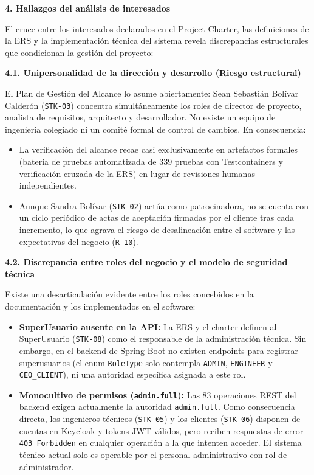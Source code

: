 \documentclass[12pt,varwidth=170mm,border=10pt]{standalone}
\newcommand{\sectiontitle}[1]{%
  \par\vspace{1.8ex}%
  {\normalfont\Large\bfseries #1\par}%
  \vspace{1.0ex}%
}
\newcommand{\subsectiontitle}[1]{%
  \par\vspace{1.3ex}%
  {\normalfont\large\bfseries #1\par}%
  \vspace{0.5ex}%
}
\begin{document}
\sectiontitle{4. Hallazgos del análisis de interesados}
\label{sec:hallazgos}

El cruce entre los interesados declarados en el Project Charter, las definiciones de la ERS y la implementación técnica del sistema revela discrepancias estructurales que condicionan la gestión del proyecto:

\subsectiontitle{4.1. Unipersonalidad de la dirección y desarrollo (Riesgo estructural)}
El Plan de Gestión del Alcance lo asume abiertamente: Sean Sebastián Bolívar Calderón (\texttt{STK-03}) concentra simultáneamente los roles de director de proyecto, analista de requisitos, arquitecto y desarrollador. No existe un equipo de ingeniería colegiado ni un comité formal de control de cambios. En consecuencia:
\begin{itemize}
  \item La verificación del alcance recae casi exclusivamente en artefactos formales (batería de pruebas automatizada de 339 pruebas con Testcontainers y verificación cruzada de la ERS) en lugar de revisiones humanas independientes.
  \item Aunque Sandra Bolívar (\texttt{STK-02}) actúa como patrocinadora, no se cuenta con un ciclo periódico de actas de aceptación firmadas por el cliente tras cada incremento, lo que agrava el riesgo de desalineación entre el software y las expectativas del negocio (\texttt{R-10}).
\end{itemize}

\subsectiontitle{4.2. Discrepancia entre roles del negocio y el modelo de seguridad técnica}
Existe una desarticulación evidente entre los roles concebidos en la documentación y los implementados en el software:
\begin{itemize}
  \item \textbf{SuperUsuario ausente en la API:} La ERS y el charter definen al SuperUsuario (\texttt{STK-08}) como el responsable de la administración técnica. Sin embargo, en el backend de Spring Boot no existen endpoints para registrar superusuarios (el enum \texttt{RoleType} solo contempla \texttt{ADMIN}, \texttt{ENGINEER} y \texttt{CEO\_CLIENT}), ni una autoridad específica asignada a este rol.
  \item \textbf{Monocultivo de permisos (\texttt{admin.full}):} Las 83 operaciones REST del backend exigen actualmente la autoridad \texttt{admin.full}. Como consecuencia directa, los ingenieros técnicos (\texttt{STK-05}) y los clientes (\texttt{STK-06}) disponen de cuentas en Keycloak y tokens JWT válidos, pero reciben respuestas de error \texttt{403 Forbidden} en cualquier operación a la que intenten acceder. El sistema técnico actual solo es operable por el personal administrativo con rol de administrador.
\end{itemize}
\end{document}
